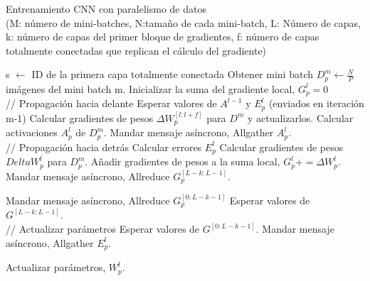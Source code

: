 \begin{algorithm}
	\caption{Entrenamiento CNN con paralelismo de datos \cite{CNN_parallel_International_Conference}\\
	(M: número de mini-batches, N:tamaño de cada mini-batch, L: Número de capas, k: número de capas del primer bloque de gradientes, f: número de capas totalmente conectadas que replican el cálculo del gradiente)} 
	\begin{algorithmic}
		\State s $\gets$ ID de la primera capa totalmente conectada
				\State Obtener mini batch $D^m_p \gets \frac{N}{P}$ imágenes del mini batch m.
				\State Inicializar la suma del gradiente local, $G^l_p = 0$\\
				
				\State // Propagación hacia delante
						\State Esperar valores de $A^{l-1}$ y $E^l_p$ (enviados en iteración m-1)
						\State Calcular gradientes de pesos $\Delta W^{[l:l+f]}_p$ para $D^m$ 
						\State y actualizarlos.
					\EndIf
					\State Calcular activaciones $A^l_p$ de $D^m_p$.
						\State Mandar mensaje asíncrono, Allgather $A^l_p$.
					\EndIf
				\EndFor \\
				
				\State // Propagación hacia detrás
					\State Calcular errores $E^l_p$
						\State Calcular gradientes de pesos $Delta W^l_p$ para $D^m_p$.
						\State Añadir gradientes de pesos a la suma local, $G^l_p += \Delta W^l_p$.
							\State Mandar mensaje asíncrono, Allreduce $G^{[L-k:L-1]}_p$.
						\EndIf
					\EndIf
				\EndFor
				
				\State Mandar mensaje asíncrono, Allreduce $G^{[0:L-k-1]}_p$
				\State Esperar valores de $G^{[L-k:L-1]}$.\\
				
				\State // Actualizar parámetros
						\State Esperar valores de $G^{[0:L-k-1]}$.
							\State Mandar mensaje asíncrono, Allgather $E^l_p$.
						\EndFor
					\EndIf
					
						\State Actualizar parámetros, $W^l_p$.
					\EndIf
				\EndFor
			
			\EndFor
		\EndFor
	\end{algorithmic}
\end{algorithm}
